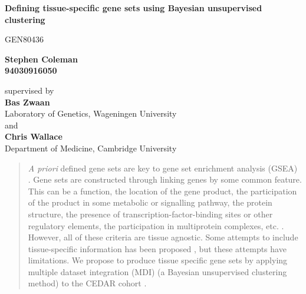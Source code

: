 \documentclass[11pt]{article} %
\begin{document}
 \pgfplotsset{compat=1.15}
	
	\begin{titlepage}
		\begin{center}
			\vspace*{1cm}
			
			\par{\LARGE \textbf{Defining tissue-specific gene sets using Bayesian unsupervised clustering}}
			
			\vspace{0.5cm}
			GEN80436
			
			\vspace{1.5cm}
			
			\textbf{Stephen Coleman \\ 94030916050}
			
			\vspace{0.8cm}
			
			supervised by \\
			\textbf{Bas Zwaan} \\
			Laboratory of Genetics, Wageningen University \\
			and \\
			\textbf{Chris Wallace} \\
			Department of Medicine, Cambridge University
			

			
			\vspace{1.0cm}
	
			\begin{abstract}
				\emph{A priori} defined gene sets are key to gene set enrichment analysis (GSEA) \cite{subramanian_gene_2005}. Gene sets are constructed through linking genes by some common feature. This can be a function, the location of the gene product, the participation of the product in some metabolic or signalling pathway, the protein structure, the presence of transcription-factor-binding sites or other regulatory elements, the participation in multiprotein complexes, etc. \cite{szklarczyk_string_2019}\cite{subramanian_gene_2005}\cite{kanehisa_new_2019} \cite{ashburner_gene_2000}. However, all of these criteria are tissue agnostic. Some attempts to include tissue-specific information has been proposed \cite{frost_computation_2018} \cite{greene_understanding_2015}, but these attempts have limitations. We propose to produce tissue specific gene sets by applying multiple dataset integration (MDI) \cite{kirk_bayesian_2012} (a Bayesian unsupervised clustering method) to the CEDAR cohort \cite{the_international_ibd_genetics_consortium_ibd_2018}.
			\end{abstract}
		

\end{center}
\end{titlepage}
\end{document}
